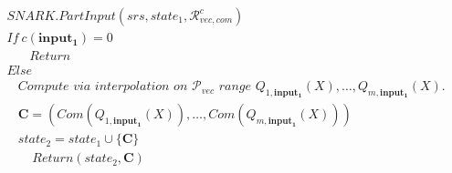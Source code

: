 \begin{align*} 
&\mathit{SNARK.PartInput}(\mathit{srs}, \mathit{state_1},\mathcal{R}_{\mathit{vec}, \mathit{com}}^c) \\  
& \mathit{If \ }  c(\mathbf{input_1}) = 0 \\
& \ \ \ \ \ \ \ \ \mathit{Return} \\
& \mathit{Else} \\
& \ \ \ \ \textit{Compute via interpolation on } \mathscr{P}_{\mathit{vec}}  \textit{ range } 
\mathit{Q_{1,\mathbf{input_1}}}(X), \ldots, \mathit{Q_{m, \mathbf{input_1}}}(X).\\
& \ \ \ \ \mathbf{C} = (\mathit{Com}(Q_{1,\mathbf{input_1}}(X)), \ldots, \mathit{Com}(Q_{m,\mathbf{input_1}}(X))) \\
& \ \ \ \ \mathit{state_2} =  \mathit{state_1} \cup \{ \mathbf{C} \} \\ 
& \ \ \ \ \ \ \ \ \ \mathit{Return} (\mathit{state_2,  \mathbf{C}})
\end{align*}

